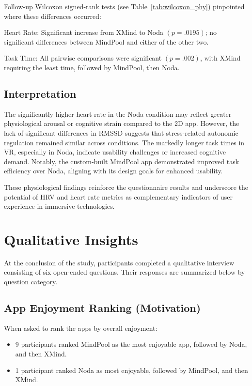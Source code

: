 \documentclass{CPP}
\begin{document}
Follow-up Wilcoxon signed-rank tests (see Table~\ref{tab:wilcoxon_phy}) pinpointed where these differences occurred:

    Heart Rate: Significant increase from XMind to Noda $(p = .0195)$; no significant differences between MindPool and either of the other two.

    Task Time: All pairwise comparisons were significant $(p = .002)$, with XMind requiring the least time, followed by MindPool, then Noda.

\subsection{Interpretation}

The significantly higher heart rate in the Noda condition may reflect greater physiological arousal or cognitive strain compared to the 2D app. However, the lack of significant differences in RMSSD suggests that stress-related autonomic regulation remained similar across conditions. The markedly longer task times in VR, especially in Noda, indicate usability challenges or increased cognitive demand. Notably, the custom-built MindPool app demonstrated improved task efficiency over Noda, aligning with its design goals for enhanced usability.

These physiological findings reinforce the questionnaire results and underscore the potential of HRV and heart rate metrics as complementary indicators of user experience in immersive technologies.




\section{Qualitative Insights}

At the conclusion of the study, participants completed a qualitative interview consisting of six open-ended questions. Their responses are summarized below by question category.

\subsection{App Enjoyment Ranking (Motivation)}
When asked to rank the apps by overall enjoyment:

\begin{itemize}
    \item 9 participants ranked MindPool as the most enjoyable app, followed by Noda, and then XMind.
    \item 1 participant ranked Noda as most enjoyable, followed by MindPool, and then XMind.
\end{itemize}
\end{document}
